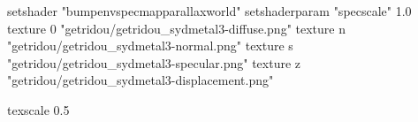 setshader "bumpenvspecmapparallaxworld"
setshaderparam "specscale" 1.0
texture 0 "getridou/getridou_sydmetal3-diffuse.png"
texture n "getridou/getridou_sydmetal3-normal.png"
texture s "getridou/getridou_sydmetal3-specular.png"
texture z "getridou/getridou_sydmetal3-displacement.png"

texscale 0.5